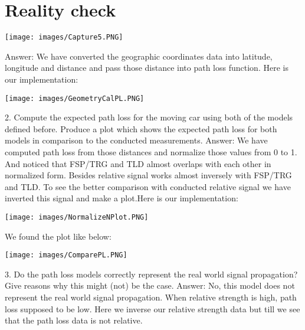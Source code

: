 \documentclass[10pt,a4paper]{article}
\begin{document}
\section{Reality check}
\begin{center}
\texttt{[image: images/Capture5.PNG]}
\end{center}
Answer: \newline We have converted the geographic coordinates data into latitude, longitude  and distance and pass those distance into path loss function. \newline Here is our implementation:
\begin{center}
\texttt{[image: images/GeometryCalPL.PNG]}
\end{center}
2. Compute the expected path loss for the moving car using both of the models defined before. Produce a plot which shows the expected path loss for both models in comparison to the conducted measurements.
\newline Answer: \newline
We have computed path loss from those distances and normalize those values from 0 to 1. And noticed that FSP/TRG and TLD almost overlaps with each other in normalized form. Besides relative signal works almost inversely with FSP/TRG and TLD. To see the better comparison with conducted relative signal we have inverted this signal and make a plot.\newline Here is our implementation:
\begin{center}
\texttt{[image: images/NormalizeNPlot.PNG]}
\end{center}
We found the plot like below:
\begin{center}
\texttt{[image: images/ComparePL.PNG]}
\end{center}
3. Do the path loss models correctly represent the real world signal propagation? Give reasons why this might (not) be the case.
\newline Answer:
\newline No, this model does not represent the real world signal propagation. When relative strength is high, path loss supposed to be low. Here we inverse our relative strength data but till we see that the path loss data is not relative.
\end{document}
